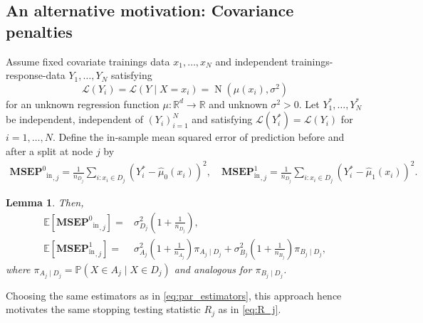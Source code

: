 \documentclass[11pt,a4paper]{article}
\newtheorem{lemma}{Lemma}
\renewcommand{\P}{\operatorname{P}}
\newcommand{\calL}{\mathcal{L}}
\newcommand{\Normal}{\operatorname{N}}
\newcommand{\R}{\mathbb{R}}  %
\newcommand{\E }{\mathbb{E}}  %
\renewcommand{\P}{\mathbb{P}}  %
\newcommand{\MSEPOin}{{\textbf{MSEP}^0}_{\text{in}}}
\newcommand{\MSEPIin}{\textbf{MSEP}^1_{\text{in}}}
\begin{document}
\subsection{An alternative motivation: Covariance penalties}
Assume fixed covariate trainings data $x_1, \dots, x_N$ and independent trainings-response-data $Y_1, \dots, Y_N $ satisfying
$$
	\calL(Y_i) = \calL\left(Y \mid X = x_i \right)  = \Normal(\mu(x_i), \sigma^2)
$$
for an unknown regression function $\mu \colon \R^d \to \R$ and unknown $\sigma^2 > 0$. Let $Y_1^*, \dots, Y_N^*$ be independent, independent of $(Y_i)_{i=1}^N$ and satisfying $\calL(Y_i^*) = \calL(Y_i)$ for $i=1, \dots, N$. Define the in-sample mean squared error of prediction before and after a split at node $j$ by
\begin{align*}
	{\MSEPOin}_{,j} = \frac{1}{n_{D_j}} \sum_{i \colon x_i \in D_j} (Y_i^* - \hat \mu_0(x_i))^2, \quad
	{\MSEPIin}_{,j} = \frac{1}{n_{D_j}} \sum_{i \colon x_i \in D_j} (Y_i^* - \hat \mu_1(x_i))^2.
\end{align*}


\begin{lemma}\label{lem:mot2}
	Then,
	\begin{align*}
		\E[{\MSEPOin}_{,j}]
		=                     & \sigma_{D_j}^2\left(1 + \frac{1}{n_{D_j}}\right),                                                                                        \\
		\E[{\MSEPIin}_{,j}] = & \sigma_{A_j}^2\left(1 + \frac{1}{n_{A_j}}\right)\pi_{A_j \mid D_j} + \sigma_{B_j}^2\left(1 + \frac{1}{n_{B_j}}\right)\pi_{B_j \mid D_j},
	\end{align*}
	where $\pi_{A_j\mid D_j} = \P(X \in A_j \mid X \in D_j)$ and analogous for $\pi_{B_j \mid D_j}$.
\end{lemma}
Choosing the same estimators as in \eqref{eq:par_estimators}, this approach hence motivates the same stopping testing statistic $R_j$ as in \eqref{eq:R_j}.
\end{document}
